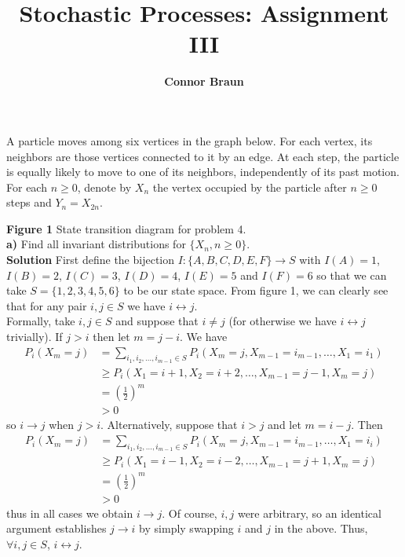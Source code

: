\documentclass[11pt, letterpaper]{article}
\title{\bf Stochastic Processes: Assignment III}
\author{\bf Connor Braun}
\date{}
\begin{document}
 
    \maketitle
     A particle moves among six vertices in the graph below. For each vertex, its neighbors are those vertices connected to it by an edge. At each step, the particle
    is equally likely to move to one of its neighbors, independently of its past motion. For each $n\geq 0$, denote by $X_n$ the vertex occupied by the particle after $n\geq 0$ steps and $Y_n=X_{2n}$.
    \begin{center}
    \end{center}
    {\bf Figure 1} State transition diagram for problem 4.\\[10pt]
    {\bf a)} Find all invariant distributions for $\{X_n,n\geq 0\}$.\\[10pt]
    {\bf Solution} First define the bijection $I:\{A,B,C,D,E,F\}\rightarrow S$ with $I(A)=1$, $I(B)=2$, $I(C)=3$, $I(D)=4$, $I(E)=5$ and $I(F)=6$ so that we can take $S=\{1,2,3,4,5,6\}$ to be our state space. From figure 1, we can clearly see that for any pair $i,j\in S$ we have $i\longleftrightarrow j$.\\[10pt]
    Formally, take $i,j\in S$ and suppose that $i\neq j$ (for otherwise we have $i\longleftrightarrow j$ trivially). If $j>i$ then let $m=j-i$. We have
    \begin{align*}
    P_i(X_m=j)&=\sum_{i_1,i_2,\dots,i_{m-1}\in S}P_i(X_m=j, X_{m-1}=i_{m-1},\dots,X_1=i_1)\\
    &\geq P_i(X_1=i+1,X_2=i+2,\dots, X_{m-1}=j-1, X_m=j)\\
    &=\left(\frac{1}{2}\right)^m\\
    &>0
    \end{align*}
    so $i\longrightarrow j$ when $j>i$. Alternatively, suppose that $i>j$ and let $m=i-j$. Then
    \begin{align*}
        P_i(X_m=j)&=\sum_{i_1,i_2,\dots,i_{m-1}\in S}P_i(X_m=j,X_{m-1}=i_{m-1},\dots,X_1=i_i)\\
        &\geq P_i(X_1=i-1,X_2=i-2,\dots,X_{m-1}=j+1,X_m=j)\\
        &=\left(\frac{1}{2}\right)^m\\
        &>0
    \end{align*}
    thus in all cases we obtain $i\longrightarrow j$. Of course, $i,j$ were arbitrary, so an identical argument establishes $j\longrightarrow i$ by simply swapping $i$ and $j$ in the above. Thus, $\forall i,j\in S$, $i\longleftrightarrow j$.
\end{document}
